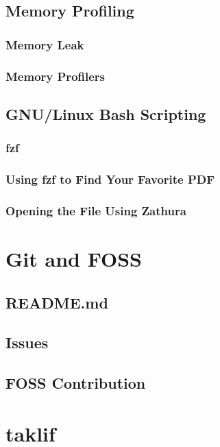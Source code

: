 \documentclass{article}
\begin{document}
\subsection{Memory Profiling}
\subsubsection{Memory Leak}
\subsubsection{Memory Profilers}
\subsection{GNU/Linux Bash Scripting}
\subsubsection{fzf}
\subsubsection{Using fzf to Find Your Favorite PDF}
\subsubsection{Opening the File Using Zathura}

\section{Git and FOSS}
\subsection{README.md}
\subsection{Issues}
\subsection{FOSS Contribution}











\section*{taklif}
\end{document}
